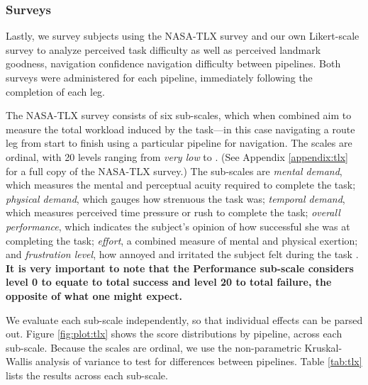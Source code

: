 \subsubsection{Surveys}
Lastly, we survey subjects using the NASA-TLX survey \cite{hart1988development} and our own Likert-scale survey to analyze perceived task difficulty as well as perceived landmark goodness, navigation confidence navigation difficulty between pipelines. Both surveys were administered for each pipeline, immediately following the completion of each leg.

The NASA-TLX survey consists of six sub-scales, which when combined aim to measure the total workload induced by the task---in this case navigating a route leg from start to finish using a particular pipeline for navigation. The scales are ordinal, with 20 levels ranging from \textit{very low} to . (See Appendix \ref{appendix:tlx} for a full copy of the NASA-TLX survey.) The sub-scales are \textit{mental demand}, which measures the mental and perceptual acuity required to complete the task; \textit{physical demand}, which gauges how strenuous the task was; \textit{temporal demand}, which measures perceived time pressure or rush to complete the task; \textit{overall performance}, which indicates the subject's opinion of how successful she was at completing the task; \textit{effort}, a combined measure of mental and physical exertion; and \textit{frustration level}, how annoyed and irritated the subject felt during the task \cite{hart1988development}. \textbf{It is very important to note that the Performance sub-scale considers level 0 to equate to total success and level 20 to total failure, the opposite of what one might expect.}

We evaluate each sub-scale independently, so that individual effects can be parsed out. Figure \ref{fig:plot:tlx} shows the score distributions by pipeline, across each sub-scale. Because the scales are ordinal, we use the non-parametric Kruskal-Wallis analysis of variance to test for differences between pipelines. Table \ref{tab:tlx} lists the results across each sub-scale.

